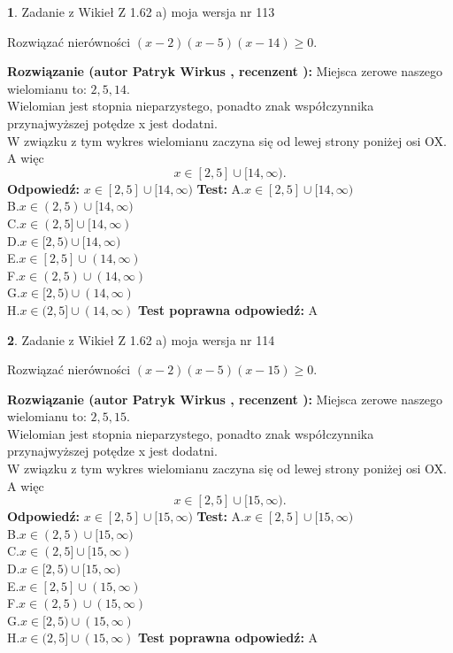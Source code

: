 \documentclass[12pt, a4paper]{article}
\theoremstyle{definition} %
\newtheorem{zad}{}
\newcommand{\zadStart}[1]{\begin{zad}#1\newline}
\newcommand{\zadStop}{\end{zad}}
\newcommand{\rozwStart}[2]{\noindent \textbf{Rozwiązanie (autor #1 , recenzent #2): }\newline}
\newcommand{\rozwStop}{\newline}
\newcommand{\odpStart}{\noindent \textbf{Odpowiedź:}\newline}
\newcommand{\odpStop}{\newline}
\newcommand{\testStart}{\noindent \textbf{Test:}\newline}
\newcommand{\testStop}{\newline}
\newcommand{\kluczStart}{\noindent \textbf{Test poprawna odpowiedź:}\newline}
\newcommand{\kluczStop}{\newline}
\begin{document}
\zadStart{Zadanie z Wikieł Z 1.62 a) moja wersja nr 113}

Rozwiązać nierówności $(x-2)(x-5)(x-14)\ge0$.
\zadStop
\rozwStart{Patryk Wirkus}{}
Miejsca zerowe naszego wielomianu to: $2, 5, 14$.\\
Wielomian jest stopnia nieparzystego, ponadto znak współczynnika przy\linebreak najwyższej potędze x jest dodatni.\\ W związku z tym wykres wielomianu zaczyna się od lewej strony poniżej osi OX. A więc $$x \in [2,5] \cup [14,\infty).$$
\rozwStop
\odpStart
$x \in [2,5] \cup [14,\infty)$
\odpStop
\testStart
A.$x \in [2,5] \cup [14,\infty)$\\
B.$x \in (2,5) \cup [14,\infty)$\\
C.$x \in (2,5] \cup [14,\infty)$\\
D.$x \in [2,5) \cup [14,\infty)$\\
E.$x \in [2,5] \cup (14,\infty)$\\
F.$x \in (2,5) \cup (14,\infty)$\\
G.$x \in [2,5) \cup (14,\infty)$\\
H.$x \in (2,5] \cup (14,\infty)$
\testStop
\kluczStart
A
\kluczStop



\zadStart{Zadanie z Wikieł Z 1.62 a) moja wersja nr 114}

Rozwiązać nierówności $(x-2)(x-5)(x-15)\ge0$.
\zadStop
\rozwStart{Patryk Wirkus}{}
Miejsca zerowe naszego wielomianu to: $2, 5, 15$.\\
Wielomian jest stopnia nieparzystego, ponadto znak współczynnika przy\linebreak najwyższej potędze x jest dodatni.\\ W związku z tym wykres wielomianu zaczyna się od lewej strony poniżej osi OX. A więc $$x \in [2,5] \cup [15,\infty).$$
\rozwStop
\odpStart
$x \in [2,5] \cup [15,\infty)$
\odpStop
\testStart
A.$x \in [2,5] \cup [15,\infty)$\\
B.$x \in (2,5) \cup [15,\infty)$\\
C.$x \in (2,5] \cup [15,\infty)$\\
D.$x \in [2,5) \cup [15,\infty)$\\
E.$x \in [2,5] \cup (15,\infty)$\\
F.$x \in (2,5) \cup (15,\infty)$\\
G.$x \in [2,5) \cup (15,\infty)$\\
H.$x \in (2,5] \cup (15,\infty)$
\testStop
\kluczStart
A
\kluczStop
\end{document}
